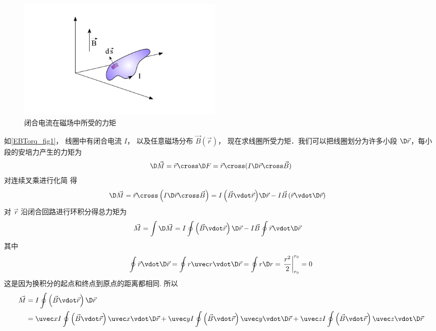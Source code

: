 
\begin{figure}[ht]
\centering
\includegraphics[width=10cm]{./figures/EBTorq.pdf}
\caption{闭合电流在磁场中所受的力矩} \label{EBTorq_fig1}
\end{figure}
如\autoref{EBTorq_fig1}， 线圈中有闭合电流 $I$， 以及任意磁场分布 $\vec B(\vec r)$， 现在求线圈所受力矩．我们可以把线圈划分为许多小段 $\D\vec r$，每小段的安培力产生的力矩为
\begin{equation}
\D\vec M = \vec r\cross \D F = \vec r \cross (I \D \vec r \cross \vec B)
\end{equation}
对连续叉乘进行化简 得
\begin{equation}
\begin{aligned}
\D\vec M &=  {\vec r \cross \left( {I\D\vec r \cross \vec B} \right)} =  {I \left( {\vec B \vdot \vec r} \right)} \D\vec r  -  I{\vec B \left( {\vec r \vdot \D\vec r} \right)}
\end{aligned}
\end{equation}
对 $\vec r$ 沿闭合回路进行环积分得总力矩为
\begin{equation}
\begin{aligned}
\vec M & = \int \D\vec M = I\oint {\left( {\vec B\vdot\vec r} \right)\D\vec r}  - I\vec B\oint {\vec r \vdot \D\vec r }
\end{aligned}
\end{equation}
其中
\begin{equation}
\oint {\vec r \vdot \D\vec r}  = \oint {r \uvec r \vdot \D\vec r}  = \oint {r \D r}  = \left.\frac{r^2}{2}\right |_{r_0}^{r_0}  = 0 %
\end{equation}
这是因为换积分的起点和终点到原点的距离都相同. 所以
\begin{equation}
\begin{aligned}
\vec M &= I\oint {\left( {\vec B \vdot \vec r} \right)\D\vec r} \\
&= \uvec x I \oint {\left( {\vec B \vdot \vec r} \right)\uvec x \vdot \D\vec r}  + \uvec y I \oint {\left( {\vec B \vdot \vec r} \right)\uvec y \vdot \D\vec r}  + \uvec zI \oint {\left( {\vec B \vdot \vec r} \right)\uvec z \vdot \D\vec r} 
\end{aligned}
\end{equation} 
